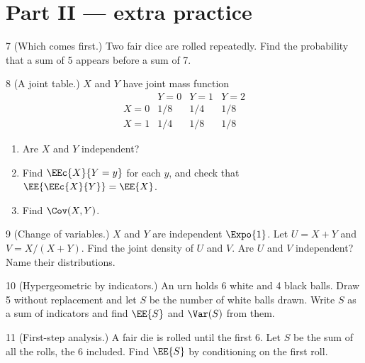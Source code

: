 \documentclass[11pt]{article}
\begin{document}
\section*{Part II --- extra practice}

\begin{problem}{7}
  (Which comes first.) Two fair dice are rolled repeatedly. Find the probability
  that a sum of 5 appears before a sum of 7.
\end{problem}
\vspace{4cm}

\begin{problem}{8}
  (A joint table.) $X$ and $Y$ have joint mass function
  \[
    \begin{array}{c|ccc}
          & Y = 0 & Y = 1 & Y = 2 \\ \hline
    X = 0 & 1/8   & 1/4   & 1/8   \\
    X = 1 & 1/4   & 1/8   & 1/8
    \end{array}
  \]
  \begin{enumerate}
    \item[(a)] Are $X$ and $Y$ independent?
    \item[(b)] Find $\EEc{X}{Y = y}$ for each $y$, and check that
      $\EE{\EEc{X}{Y}} = \EE{X}$.
    \item[(c)] Find $\Cov(X,Y)$.
  \end{enumerate}
\end{problem}
\vfill\newpage

\begin{problem}{9}
  (Change of variables.) $X$ and $Y$ are independent $\Expo{1}$. Let
  $U = X + Y$ and $V = X/(X+Y)$. Find the joint density of $U$ and $V$. Are $U$
  and $V$ independent? Name their distributions.
\end{problem}
\vspace{5cm}

\begin{problem}{10}
  (Hypergeometric by indicators.) An urn holds 6 white and 4 black balls. Draw 5
  without replacement and let $S$ be the number of white balls drawn. Write $S$
  as a sum of indicators and find $\EE{S}$ and $\Var(S)$ from them.
\end{problem}
\vfill\newpage

\begin{problem}{11}
  (First-step analysis.) A fair die is rolled until the first 6. Let $S$ be the
  sum of all the rolls, the 6 included. Find $\EE{S}$ by conditioning on the first
  roll.
\end{problem}
\vspace{4cm}
\end{document}
